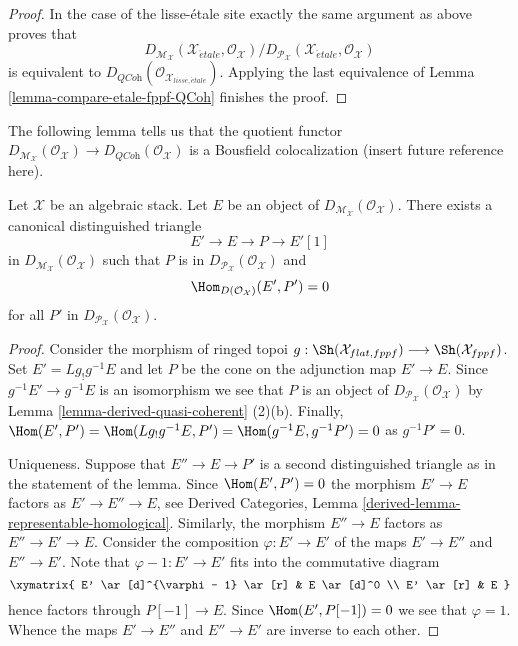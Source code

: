 \begin{proof}
\medskip\noindent
In the case of the lisse-\'etale site exactly the same argument as above
proves that
$$
D_{\mathcal{M}_\mathcal{X}}(
\mathcal{X}_{\acute{e}tale}, \mathcal{O}_\mathcal{X})
/
D_{\mathcal{P}_\mathcal{X}}(
\mathcal{X}_{\acute{e}tale}, \mathcal{O}_\mathcal{X})
$$
is equivalent to
$D_{\textit{QCoh}}(\mathcal{O}_{\mathcal{X}_{lisse,\acute{e}tale}})$.
Applying the last equivalence of
Lemma \ref{lemma-compare-etale-fppf-QCoh}
finishes the proof.
\end{proof}

\noindent
The following lemma tells us that the quotient functor
$D_{\mathcal{M}_\mathcal{X}}(\mathcal{O}_\mathcal{X}) \to
D_{\textit{QCoh}}(\mathcal{O}_\mathcal{X})$ is a Bousfield
colocalization (insert future reference here).

\begin{lemma}
\label{lemma-bousfield-colocalization}
Let $\mathcal{X}$ be an algebraic stack.
Let $E$ be an object of $D_{\mathcal{M}_\mathcal{X}}(\mathcal{O}_\mathcal{X})$.
There exists a canonical distinguished triangle
$$
E' \to E \to P \to E'[1]
$$
in $D_{\mathcal{M}_\mathcal{X}}(\mathcal{O}_\mathcal{X})$ such that
$P$ is in $D_{\mathcal{P}_\mathcal{X}}(\mathcal{O}_\mathcal{X})$
and
$$
\Hom_{D(\mathcal{O}_\mathcal{X})}(E', P') = 0
$$
for all $P'$ in $D_{\mathcal{P}_\mathcal{X}}(\mathcal{O}_\mathcal{X})$.
\end{lemma}

\begin{proof}
Consider the morphism of ringed topoi
$g : \Sh(\mathcal{X}_{flat, fppf}) \longrightarrow \Sh(\mathcal{X}_{fppf})$.
Set $E' = Lg_!g^{-1}E$ and let $P$ be the cone on the adjunction
map $E' \to E$. Since $g^{-1}E' \to g^{-1}E$ is an isomorphism we see that
$P$ is an object of $D_{\mathcal{P}_\mathcal{X}}(\mathcal{O}_\mathcal{X})$ by
Lemma \ref{lemma-derived-quasi-coherent} (2)(b).
Finally, $\Hom(E', P') = \Hom(Lg_!g^{-1}E, P') = \Hom(g^{-1}E, g^{-1}P') = 0$
as $g^{-1}P' = 0$.

\medskip\noindent
Uniqueness. Suppose that $E'' \to E \to P'$ is a second distinguished
triangle as in the statement of the lemma. Since $\Hom(E', P') = 0$
the morphism $E' \to E$ factors as $E' \to E'' \to E$, see
Derived Categories, Lemma \ref{derived-lemma-representable-homological}.
Similarly, the morphism $E'' \to E$ factors as $E'' \to E' \to E$.
Consider the composition $\varphi : E' \to E'$ of the maps $E' \to E''$ and
$E'' \to E'$. Note that $\varphi - 1 : E' \to E'$ fits into the commutative
diagram
$$
\xymatrix{
E' \ar[d]^{\varphi - 1} \ar[r] & E \ar[d]^0 \\
E' \ar[r] & E
}
$$
hence factors through $P[-1] \to E$. Since $\Hom(E', P[-1]) = 0$
we see that $\varphi = 1$. Whence the maps $E' \to E''$ and $E'' \to E'$
are inverse to each other.
\end{proof}







